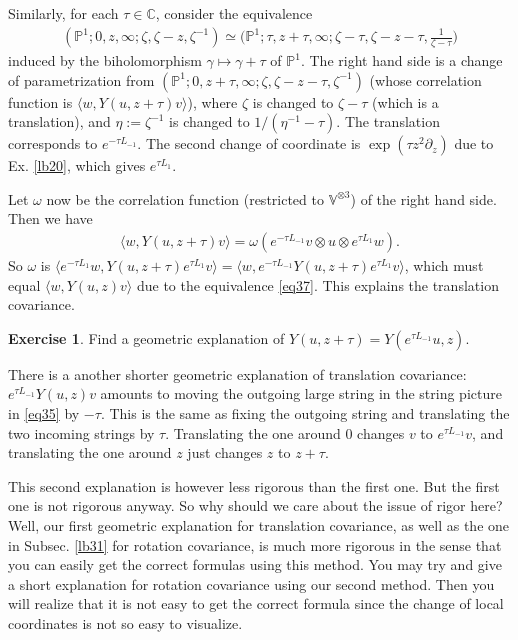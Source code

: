 \documentclass[12pt,a4paper,notitlepage]{article}
\theoremstyle{definition}
\newtheorem{exe}[df]{Exercise}
\theoremstyle{plain}
\newcommand{\bk}[1]{\langle {#1}\rangle}
\newcommand{\Vbb}{\mathbb V}
\newcommand{\Cbb}{\mathbb C}
\newcommand{\Pbb}{\mathbb P}
\numberwithin{equation}{section}
\begin{document}
\subsection{}\label{lb40}

Similarly, for each $\tau\in\Cbb$, consider the equivalence
\begin{align}
	(\Pbb^1;0,z,\infty;\zeta,\zeta-z,\zeta^{-1})\simeq \big(\Pbb^1;\tau,z+\tau,\infty;\zeta-\tau,\zeta-z-\tau,\frac 1{\zeta-\tau}\big)\label{eq37}
\end{align}
induced by the biholomorphism $\gamma\mapsto\gamma+\tau$ of $\Pbb^1$. The right hand side is a change of parametrization from $(\Pbb^1;0,z+\tau,\infty;\zeta,\zeta-z-\tau,\zeta^{-1})$ (whose correlation function is $\bk{w,Y(u,z+\tau)v}$), where $\zeta$ is changed to $\zeta-\tau$ (which is a translation), and $\eta:=\zeta^{-1}$ is changed to $1/(\eta^{-1}-\tau)$. The translation corresponds to $e^{-\tau L_{-1}}$. The second change of coordinate is $\exp(\tau z^{2}\partial_z)$ due to Ex. \ref{lb20}, which gives $e^{\tau L_1}$.

Let $\omega$ now be the correlation function (restricted to $\Vbb^{\otimes 3}$) of the right hand side. Then we have
\begin{align*}
\bk{w,Y(u,z+\tau)v}=\omega(e^{-\tau L_{-1}}v\otimes u\otimes e^{\tau L_1}w).
\end{align*} 
So $\omega$ is $\bk{e^{-\tau L_1}w,Y(u,z+\tau)e^{\tau L_1}v}=\bk{w,e^{-\tau L_{-1}}Y(u,z+\tau)e^{\tau L_1}v}$, which must equal $\bk{w,Y(u,z)v}$ due to the equivalence \eqref{eq37}. This explains the translation covariance.

\begin{exe}
Find a geometric explanation of $Y(u,z+\tau)=Y(e^{\tau L_{-1}}u,z)$.
\end{exe}

There is a another shorter geometric explanation of translation covariance: $e^{\tau L_{-1}}Y(u,z)v$ amounts to moving the outgoing large string in the string picture in \eqref{eq35} by $-\tau$. This is the same as fixing the outgoing string and translating the two incoming strings by $\tau$. Translating the one around $0$ changes $v$ to $e^{\tau L_{-1}}v$, and translating the one around $z$ just changes $z$ to $z+\tau$.

This second explanation is however less rigorous than the first one. But the first one is not  rigorous anyway. So why should we care about the issue of rigor here? Well, our first geometric explanation for translation covariance, as well as the one in Subsec. \ref{lb31} for rotation covariance, is much more rigorous in the sense that you can easily get the correct formulas using this method. You may try and give a short explanation for rotation covariance using our second method. Then you will realize that it is not easy to get the correct formula since the change of local coordinates is not so easy to visualize.
\end{document}
